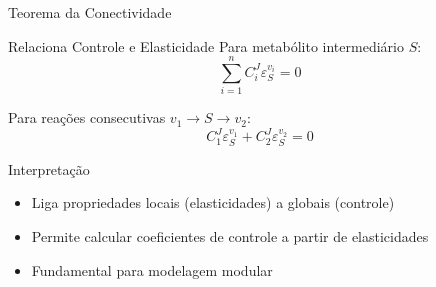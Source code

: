 \begin{frame}[shrink=10]{Teorema da Conectividade}
\begin{block}{Relaciona Controle e Elasticidade}
Para metabólito intermediário $S$:
\begin{equation*}
\sum_{i=1}^{n} C_i^J \varepsilon_S^{v_i} = 0
\end{equation*}

Para reações consecutivas $v_1 \rightarrow S \rightarrow v_2$:
\begin{equation*}
C_1^J \varepsilon_S^{v_1} + C_2^J \varepsilon_S^{v_2} = 0
\end{equation*}
\end{block}

\vspace{0.3cm}

\begin{exampleblock}{Interpretação}
\begin{itemize}
    \item Liga propriedades locais (elasticidades) a globais (controle)
    \item Permite calcular coeficientes de controle a partir de elasticidades
    \item Fundamental para modelagem modular
\end{itemize}
\end{exampleblock}
\end{frame}

